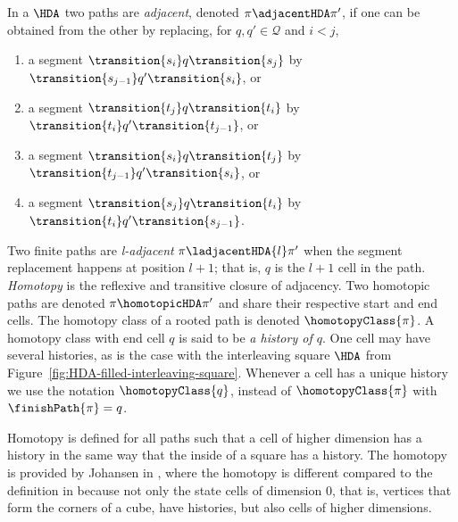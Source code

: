    \begin{definition}
    \label{def:histories-for-HDA}
    
        In a $\HDA$ two paths are \emph{adjacent}, denoted $\pi\adjacentHDA\pi'$, if one can be obtained from the other by replacing, for $q,q'\in \mathcal{Q}$ and $i<j$,
        
        \begin{enumerate}
            \item a segment $\transition{s_{i}}q\transition{s_{j}}$ by $\transition{s_{j-1}}q'\transition{s_{i}}$, or
            \item a segment $\transition{t_{j}}q\transition{t_{i}}$ by $\transition{t_{i}}q'\transition{t_{j-1}}$, or
            \item a segment $\transition{s_{i}}q\transition{t_{j}}$ by $\transition{t_{j-1}}q'\transition{s_{i}}$, or
            \item a segment $\transition{s_{j}}q\transition{t_{i}}$ by $\transition{t_{i}}q'\transition{s_{j-1}}$.
        \end{enumerate}

        Two finite paths are \textit{l-adjacent} $\pi\ladjacentHDA{l}\pi'$ when the segment replacement happens at position $l+1$; that is, $q$ is the $l+1$ cell in the path. \emph{Homotopy} is the reflexive and transitive closure of adjacency. Two homotopic paths are denoted $\pi\homotopicHDA\pi'$ and share their respective start and end cells. The homotopy class of a rooted path is denoted $\homotopyClass{\pi}$. A homotopy class with end cell $q$ is said to be \emph{a history of $q$}. One cell may have several histories, as is the case with the interleaving square $\HDA$ from Figure~\ref{fig:HDA-filled-interleaving-square}. Whenever a cell has a unique history we use the notation $\homotopyClass{q}$, instead of $\homotopyClass{\pi}$ with $\finishPath{\pi}=q$.
    \end{definition}

    Homotopy is defined for all paths such that a cell of higher dimension has a history in the same way that the inside of a square has a history. The homotopy is provided by Johansen in \cite{Johansen16STstruct}, where the homotopy is different compared to the definition in \cite[Section 1.6]{Goubault18RelationshipsModelsForConcurrency} because not only the state cells of dimension $0$, that is, vertices that form the corners of a cube, have histories, but also cells of higher dimensions.
    
